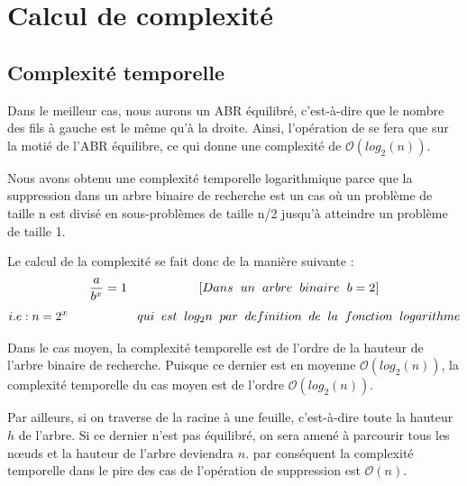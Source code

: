 \section{Calcul de complexité}
\subsection{Complexité temporelle}
Dans le meilleur cas, nous aurons un ABR équilibré, c’est-à-dire que le nombre des fils à gauche est le même qu’à la droite. Ainsi, l'opération de se fera que sur la motié de l'ABR équilibre, ce qui donne une complexité de $\mathcal{O}(log_2(n))$.  
\par
Nous avons obtenu une complexité temporelle logarithmique parce que la suppression dans un arbre binaire de recherche est un cas où un problème de taille n est divisé en sous-problèmes de taille n/2 jusqu'à atteindre un problème de taille 1.
\par
Le calcul de la complexité se fait donc de la manière suivante :
$$ \frac {a}{b^x}=1  \hspace{2cm}[Dans\hspace{0.2cm} un\hspace{0.2cm} arbre\hspace{0.2cm} binaire\hspace{0.2cm} b = 2] $$
$$i.e : n=2^x\hspace{2cm} qui\hspace{0.2cm} est\hspace{0.2cm} log_2 n\hspace{0.2cm} par\hspace{0.2cm} definition\hspace{0.2cm} de\hspace{0.2cm} la\hspace{0.2cm} fonction\hspace{0.2cm} logarithme$$
\par 
Dans le cas moyen, la complexité temporelle est de l’ordre de la hauteur de l’arbre binaire de recherche. Puisque ce dernier est en moyenne $\mathcal{O}(log_2(n))$, la complexité temporelle du cas moyen est de l’ordre $\mathcal{O}(log_2(n))$.
\par
Par ailleurs, si on traverse de la racine à une feuille, c’est-à-dire toute la hauteur $h$ de l’arbre. Si ce dernier n’est pas équilibré, on sera amené à parcourir tous les nœuds et la hauteur de l’arbre deviendra $n$. par conséquent la complexité temporelle dans le pire des cas de l’opération de suppression est $\mathcal{O}(n)$.

